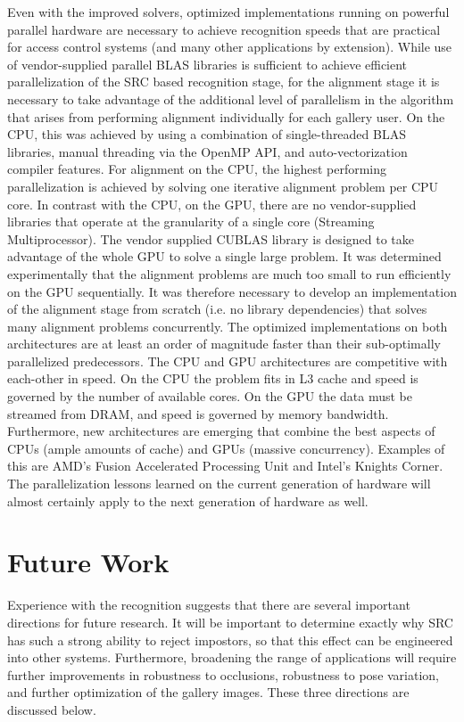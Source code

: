 Even with the improved solvers, optimized implementations running on powerful
parallel hardware are necessary to achieve recognition speeds that are
practical for access control systems (and many other applications by
extension).  While use of vendor-supplied parallel BLAS libraries is sufficient
to achieve efficient parallelization of the SRC based recognition stage, for
the alignment stage it is necessary to take advantage of the additional level
of parallelism in the algorithm that arises from performing alignment
individually for each gallery user.  On the CPU, this was achieved by using a
combination of single-threaded BLAS libraries, manual threading via the OpenMP
API, and auto-vectorization compiler features.  For alignment on the CPU, the
highest performing parallelization is achieved by solving one iterative
alignment problem per CPU core.  In contrast with the CPU, on the GPU, there
are no vendor-supplied libraries that operate at the granularity of a single
core (Streaming Multiprocessor).  The vendor supplied CUBLAS library is
designed to take advantage of the whole GPU to solve a single large problem.
It was determined experimentally that the alignment problems are much too small
to run efficiently on the GPU sequentially. It was therefore necessary to
develop an implementation of the alignment stage from scratch (i.e. no library
dependencies) that solves many alignment problems concurrently.  The optimized
implementations on both architectures are at least an order of magnitude faster
than their sub-optimally parallelized predecessors.  The CPU and GPU
architectures are competitive with each-other in speed.  On the CPU the problem
fits in L3 cache and speed is governed by the number of available cores.  On
the GPU the data must be streamed from DRAM, and speed is governed by memory
bandwidth.  Furthermore, new architectures are emerging that combine the best
aspects of CPUs (ample amounts of cache) and GPUs (massive concurrency).
Examples of this are AMD's Fusion Accelerated Processing Unit and Intel's
Knights Corner.  The parallelization lessons learned on the current generation
of hardware will almost certainly apply to the next generation of hardware as
well.

\section{Future Work} Experience with the recognition suggests that there are
several important directions for future research.  It will be important to
determine exactly why SRC has such a strong ability to reject impostors, so
that this effect can be engineered into other systems.  Furthermore, broadening
the range of applications will require further improvements in robustness to
occlusions, robustness to pose variation, and further optimization of the
gallery images.  These three directions are discussed below.  

